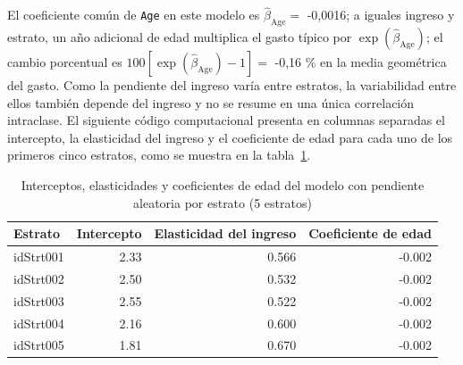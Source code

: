 \documentclass[
  spanish,
  11pt,
  letterpaper,
  oneside,
  open=any]{scrbook}
\newenvironment{Shaded}{\begin{snugshade}}{\end{snugshade}}
\newcommand{\AttributeTok}[1]{\textcolor[rgb]{0.40,0.45,0.13}{#1}}
\newcommand{\DecValTok}[1]{\textcolor[rgb]{0.68,0.00,0.00}{#1}}
\newcommand{\FunctionTok}[1]{\textcolor[rgb]{0.28,0.35,0.67}{#1}}
\newcommand{\NormalTok}[1]{\textcolor[rgb]{0.00,0.23,0.31}{#1}}
\newcommand{\OtherTok}[1]{\textcolor[rgb]{0.00,0.23,0.31}{#1}}
\newcommand{\SpecialCharTok}[1]{\textcolor[rgb]{0.37,0.37,0.37}{#1}}
\newcommand{\StringTok}[1]{\textcolor[rgb]{0.13,0.47,0.30}{#1}}
\begin{document}
El coeficiente común de \texttt{Age} en este modelo es
\(\hat\beta_{\mathrm{Age}}=\) -0,0016; a iguales ingreso y estrato, un
año adicional de edad multiplica el gasto típico por
\(\exp(\hat\beta_{\mathrm{Age}})\); el cambio porcentual es
\(100[\exp(\hat\beta_{\mathrm{Age}})-1]=\) -0,16 \% en la media
geométrica del gasto. Como la pendiente del ingreso varía entre
estratos, la variabilidad entre ellos también depende del ingreso y no
se resume en una única correlación intraclase. El siguiente código
computacional presenta en columnas separadas el intercepto, la
elasticidad del ingreso y el coeficiente de edad para cada uno de los
primeros cinco estratos, como se muestra en la
tabla~\ref{tbl-coef-pendiente-aleatoria}.

\begin{Shaded}
\end{Shaded}

{

\begin{longtable}[]{@{}lrrr@{}}

\caption{\label{tbl-coef-pendiente-aleatoria}Interceptos, elasticidades
y coeficientes de edad del modelo con pendiente aleatoria por estrato (5
estratos)}

\tabularnewline

\toprule\noalign{}
Estrato & Intercepto & Elasticidad del ingreso & Coeficiente de edad \\
\midrule\noalign{}
\endhead
\bottomrule\noalign{}
\endlastfoot
idStrt001 & 2.33 & 0.566 & -0.002 \\
idStrt002 & 2.50 & 0.532 & -0.002 \\
idStrt003 & 2.55 & 0.522 & -0.002 \\
idStrt004 & 2.16 & 0.600 & -0.002 \\
idStrt005 & 1.81 & 0.670 & -0.002 \\

\end{longtable}

}
\end{document}
